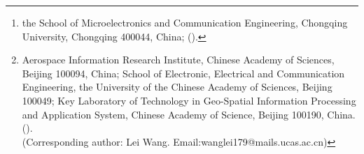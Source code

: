 



\author{Lei Wang\thanks{the School of Microelectronics and Communication
		Engineering, Chongqing University, Chongqing 400044, China;
		().
	}
	\and Xiurui Geng\thanks{Aerospace Information Research Institute, Chinese Academy of Sciences, Beijing 100094, China;
		School  of Electronic, Electrical and Communication Engineering,  the University of the Chinese Academy of Sciences, Beijing 100049;
		Key Laboratory of  Technology in Geo-Spatial Information Processing and Application System, Chinese Academy of Science, Beijing 100190, China. 
		().
		\\
			(Corresponding author: Lei Wang. Email:wanglei179@mails.ucas.ac.cn)
	}
	\and  Lei Zhang \footnotemark[2]
}

\usepackage{amsopn}
\DeclareMathOperator{\diag}{diag}



